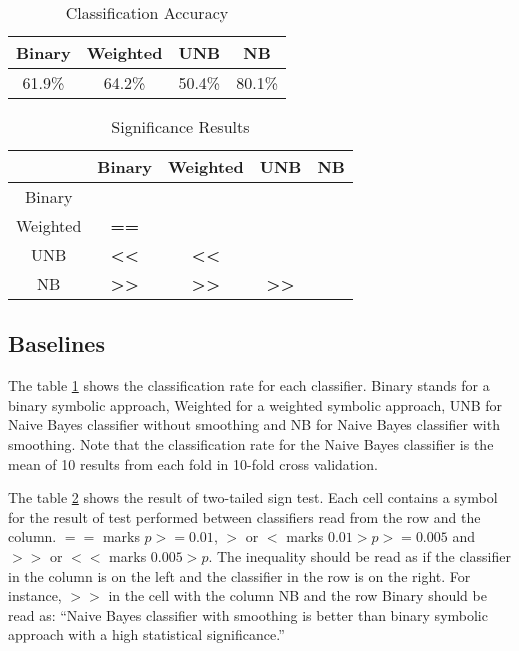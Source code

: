 \begin{table}[]
\centering
\caption{Classification Accuracy}
\label{tab:crate}
\begin{tabular}{|c|c|c|c|}
\hline
Binary & Weighted & UNB & NB     \\ \hline
61.9\% & 64.2\% & 50.4\%  & 80.1\% \\ \hline
\end{tabular}
\end{table}
\begin{table}[]
\centering
\caption{Significance Results}
\label{tab:comp}
\begin{tabular}{|c|c|c|c|c|}
\hline
\textbf{} & Binary                            & Weighted    & UNB                      & NB        \\ \hline
Binary    & \textbf{}                         & \textbf{}     & \textbf{}                    & \textbf{} \\ \hline
Weighted  & \textbf{==}                       & \textbf{}  & \textbf{}                       & \textbf{} \\ \hline
UNB        & \textbf{\textless\textless} & \textbf{\textless\textless}&\textbf{} & \textbf{} \\ \hline
NB        & \textbf{\textgreater\textgreater} & \textbf{\textgreater\textgreater}&\textbf{\textgreater\textgreater} & \textbf{} \\ \hline
\end{tabular}
\end{table}
\subsection{Baselines}
The table \ref{tab:crate} shows the classification rate for each classifier. Binary stands for a binary symbolic approach, Weighted for a weighted symbolic approach, UNB for Naive Bayes classifier without smoothing and NB for Naive Bayes classifier with smoothing. Note that the classification rate for the Naive Bayes classifier is the mean of 10 results from each fold in 10-fold cross validation.

The table \ref{tab:comp} shows the result of two-tailed sign test. Each cell contains a symbol for the result of test performed between classifiers read from the row and the column. $==$ marks $p >= 0.01$, $>$ or $<$ marks $0.01 > p >= 0.005$ and  $>>$ or $<<$ marks $0.005 > p$. The inequality should be read as if the classifier in the column is on the left and the classifier in the row  is on the right. For instance, $>>$ in the cell with the column NB and the row Binary should be read as: ``Naive Bayes classifier with smoothing is better than binary symbolic approach with a high statistical significance.''


